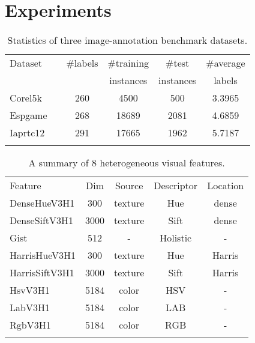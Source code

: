 \documentclass[a4paper]{article}
\begin{document}
\section{Experiments}
\begin{table}[t]
\center
\begin{tabular}{@{}l@{}lcccc}
\Xhline{2\arrayrulewidth}
Dataset   & & \#labels & \#training  &\#test         & \#average \\ 
          & &         & instances  & instances    & labels  \\ 
\Xhline{2\arrayrulewidth}
\textsf{Corel5k}   &  & 260 &  4500 &   500 &  3.3965 \\ 
\textsf{Espgame}   &  & 268 & 18689 &  2081 &  4.6859 \\
\textsf{Iaprtc12}  &  & 291 & 17665 &  1962 &  5.7187 \\
\Xhline{2\arrayrulewidth}
\end{tabular}
\caption{Statistics of three image-annotation benchmark datasets.}
\label{tab:data}
\end{table}
  
\begin{table}[!t]
\small
\center
\begin{tabular}{lcccc}
\Xhline{2\arrayrulewidth} 
Feature        & Dim       & Source  & Descriptor   & Location   \\ 
\Xhline{2\arrayrulewidth}
DenseHueV3H1   &   300     & texture & Hue          & dense      \\
DenseSiftV3H1  &  3000     & texture & Sift         & dense      \\
Gist           &   512     &  -      & Holistic     & -          \\
HarrisHueV3H1  &   300     & texture & Hue          & Harris     \\
HarrisSiftV3H1 &  3000     & texture & Sift         & Harris     \\
HsvV3H1        &  5184     & color   & HSV          & -         \\
LabV3H1        &  5184     & color   & LAB          & -       \\ 
RgbV3H1        &  5184     & color   & RGB          & -        \\
\Xhline{2\arrayrulewidth}
\end{tabular}
\normalsize
\caption{A summary of 8 heterogeneous visual features.}
\label{tab:features}
\end{table}
\end{document}
